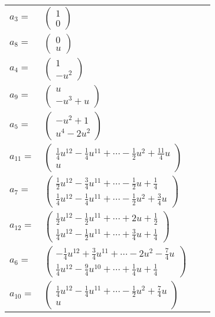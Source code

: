\documentclass[1p]{elsarticle_modified}
\theoremstyle{definition}
\begin{document}
\begin{tabular}{m{7pt} m{180pt} m{7pt} m{180pt} }
\flushright $a_{3}=$&$\begin{pmatrix}1\\0\end{pmatrix}$ \\
\flushright $a_{8}=$&$\begin{pmatrix}0\\u\end{pmatrix}$ \\
\flushright $a_{4}=$&$\begin{pmatrix}1\\- u^2\end{pmatrix}$ \\
\flushright $a_{9}=$&$\begin{pmatrix}u\\- u^3+u\end{pmatrix}$ \\
\flushright $a_{5}=$&$\begin{pmatrix}- u^2+1\\u^4-2 u^2\end{pmatrix}$ \\
\flushright $a_{11}=$&$\begin{pmatrix}\frac{1}{4} u^{12}-\frac{1}{4} u^{11}+\cdots-\frac{1}{2} u^2+\frac{11}{4} u\\u\end{pmatrix}$ \\
\flushright $a_{7}=$&$\begin{pmatrix}\frac{1}{2} u^{12}-\frac{3}{4} u^{11}+\cdots-\frac{1}{2} u+\frac{1}{4}\\\frac{1}{4} u^{12}-\frac{1}{4} u^{11}+\cdots-\frac{1}{2} u^2+\frac{3}{4} u\end{pmatrix}$ \\
\flushright $a_{12}=$&$\begin{pmatrix}\frac{1}{2} u^{12}-\frac{1}{2} u^{11}+\cdots+2 u+\frac{1}{2}\\\frac{1}{4} u^{12}-\frac{1}{2} u^{11}+\cdots+\frac{3}{4} u+\frac{1}{4}\end{pmatrix}$ \\
\flushright $a_{6}=$&$\begin{pmatrix}-\frac{1}{4} u^{12}+\frac{3}{4} u^{11}+\cdots-2 u^2-\frac{7}{4} u\\\frac{1}{4} u^{12}-\frac{9}{4} u^{10}+\cdots+\frac{1}{4} u+\frac{1}{4}\end{pmatrix}$ \\
\flushright $a_{10}=$&$\begin{pmatrix}\frac{1}{4} u^{12}-\frac{1}{4} u^{11}+\cdots-\frac{1}{2} u^2+\frac{7}{4} u\\u\end{pmatrix}$ \\

\end{tabular}
\end{document}
